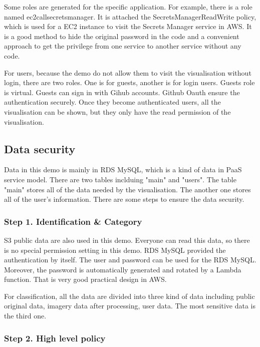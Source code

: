 \documentclass[conference]{IEEEtran}
\begin{document}
Some roles are generated for the specific application. For example, there is a role named ec2callsecretsmanager. It is attached the SecretsManagerReadWrite 
policy, which is used for a EC2 instance to visit the Secrets Manager service in AWS. It is a good method to hide the original password in the code and a 
convenient approach to get the privilege from one service to another service without any code.

For users, because the demo do not allow them to visit the visualisation without login, there are two roles. One is for guests, another is for login users. 
Guests role is virtual. Guests can sign in with Gihub accounts. Github Oauth ensure the authentication securely. Once they become authenticated users, 
all the visualisation can be shown, but they only have the read permission of the visualisation.

\subsection{Data security}

Data in this demo is mainly in RDS MySQL, which is a kind of data in PaaS service model. There are two tables inclduing "main" and "users". The table "main" 
stores all of the data needed by the visualisation. The another one stores all of the user's information. There are some steps to ensure the data security.

\subsubsection{Step 1. Identification \& Category}

S3 public data are also used in this demo. Everyone can read this data, so there is no special permission setting in this demo. RDS MySQL provided the authentication 
by itself. The user and password can be used for the RDS MySQL. Moreover, the password is automatically generated and rotated by a Lambda function. That is 
very good practical design in AWS.

For classification, all the data are divided into three kind of data including public original data, imagery data after processing, user data. The most sensitive 
data is the third one. 

\subsubsection{Step 2. High level policy}
\end{document}
